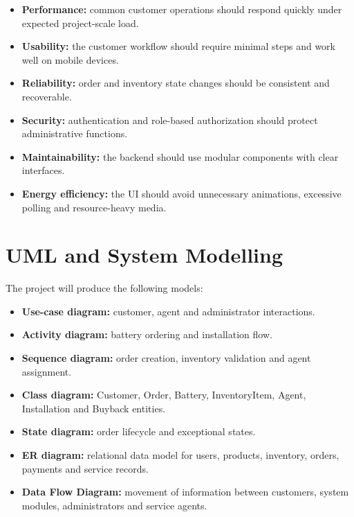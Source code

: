 \documentclass[11pt,a4paper]{article}
\begin{document}
\begin{itemize}[leftmargin=0.7cm]
    \item \textbf{Performance:} common customer operations should respond
    quickly under expected project-scale load.
    \item \textbf{Usability:} the customer workflow should require minimal
    steps and work well on mobile devices.
    \item \textbf{Reliability:} order and inventory state changes should be
    consistent and recoverable.
    \item \textbf{Security:} authentication and role-based authorization
    should protect administrative functions.
    \item \textbf{Maintainability:} the backend should use modular components
    with clear interfaces.
    \item \textbf{Energy efficiency:} the UI should avoid unnecessary
    animations, excessive polling and resource-heavy media.
\end{itemize}

\section{UML and System Modelling}

The project will produce the following models:

\begin{itemize}[leftmargin=0.7cm]
    \item \textbf{Use-case diagram:} customer, agent and administrator
    interactions.
    \item \textbf{Activity diagram:} battery ordering and installation flow.
    \item \textbf{Sequence diagram:} order creation, inventory validation and
    agent assignment.
    \item \textbf{Class diagram:} Customer, Order, Battery, InventoryItem,
    Agent, Installation and Buyback entities.
    \item \textbf{State diagram:} order lifecycle and exceptional states.
    \item \textbf{ER diagram:} relational data model for users, products,
    inventory, orders, payments and service records.
    \item \textbf{Data Flow Diagram:} movement of information between
    customers, system modules, administrators and service agents.
\end{itemize}
\end{document}
